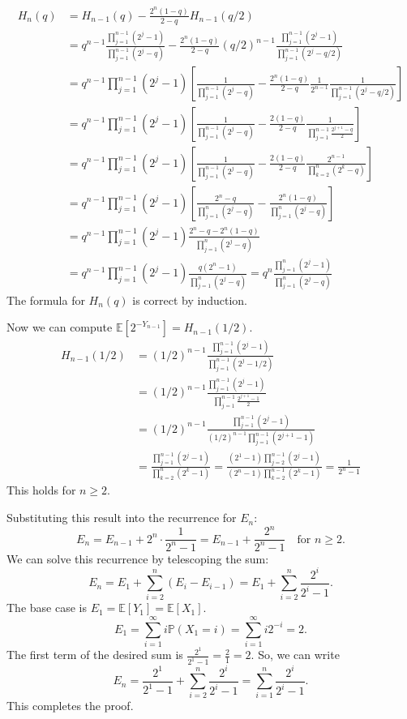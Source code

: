 \documentclass[12pt,a4paper]{article}
\theoremstyle{definition}
\begin{document}
    \begin{align}
        H_n(q) &= H_{n-1}(q) - \frac{2^n(1-q)}{2-q} H_{n-1}(q/2) \\
        &= q^{n-1} \frac{\prod_{j=1}^{n-1}(2^j-1)}{\prod_{j=1}^{n-1}(2^j-q)} - \frac{2^n(1-q)}{2-q} (q/2)^{n-1} \frac{\prod_{j=1}^{n-1}(2^j-1)}{\prod_{j=1}^{n-1}(2^j-q/2)} \\
        &= q^{n-1}\prod_{j=1}^{n-1}(2^j-1) \left[ \frac{1}{\prod_{j=1}^{n-1}(2^j-q)} - \frac{2^n(1-q)}{2-q} \frac{1}{2^{n-1}} \frac{1}{\prod_{j=1}^{n-1}(2^j-q/2)} \right] \\
        &= q^{n-1}\prod_{j=1}^{n-1}(2^j-1) \left[ \frac{1}{\prod_{j=1}^{n-1}(2^j-q)} - \frac{2(1-q)}{2-q} \frac{1}{\prod_{j=1}^{n-1}\frac{2^{j+1}-q}{2}} \right] \\
        &= q^{n-1}\prod_{j=1}^{n-1}(2^j-1) \left[ \frac{1}{\prod_{j=1}^{n-1}(2^j-q)} - \frac{2(1-q)}{2-q} \frac{2^{n-1}}{\prod_{k=2}^{n}(2^k-q)} \right] \\
        &= q^{n-1}\prod_{j=1}^{n-1}(2^j-1) \left[ \frac{2^n-q}{\prod_{j=1}^{n}(2^j-q)} - \frac{2^n(1-q)}{\prod_{j=1}^{n}(2^j-q)} \right] \\
        &= q^{n-1}\prod_{j=1}^{n-1}(2^j-1) \frac{2^n-q - 2^n(1-q)}{\prod_{j=1}^{n}(2^j-q)} \\
        &= q^{n-1}\prod_{j=1}^{n-1}(2^j-1) \frac{q(2^n-1)}{\prod_{j=1}^{n}(2^j-q)} = q^n \frac{\prod_{j=1}^{n}(2^j-1)}{\prod_{j=1}^{n}(2^j-q)}
    \end{align}
    The formula for $H_n(q)$ is correct by induction.

    Now we can compute $\mathbb{E}[2^{-Y_{n-1}}] = H_{n-1}(1/2)$.
    \begin{align}
        H_{n-1}(1/2) &= (1/2)^{n-1} \frac{\prod_{j=1}^{n-1}(2^j-1)}{\prod_{j=1}^{n-1}(2^j-1/2)} \\
        &= (1/2)^{n-1} \frac{\prod_{j=1}^{n-1}(2^j-1)}{\prod_{j=1}^{n-1}\frac{2^{j+1}-1}{2}} \\
        &= (1/2)^{n-1} \frac{\prod_{j=1}^{n-1}(2^j-1)}{(1/2)^{n-1}\prod_{j=1}^{n-1}(2^{j+1}-1)} \\
        &= \frac{\prod_{j=1}^{n-1}(2^j-1)}{\prod_{k=2}^{n}(2^k-1)} = \frac{(2^1-1)\prod_{j=2}^{n-1}(2^j-1)}{(2^n-1)\prod_{k=2}^{n-1}(2^k-1)} = \frac{1}{2^n-1}
    \end{align}
    This holds for $n \geq 2$.

    Substituting this result into the recurrence for $E_n$:
    \[ E_n = E_{n-1} + 2^n \cdot \frac{1}{2^n-1} = E_{n-1} + \frac{2^n}{2^n-1} \quad \text{for } n \geq 2. \]
    We can solve this recurrence by telescoping the sum:
    \[ E_n = E_1 + \sum_{i=2}^n (E_i - E_{i-1}) = E_1 + \sum_{i=2}^n \frac{2^i}{2^i-1}. \]
    The base case is $E_1 = \mathbb{E}[Y_1] = \mathbb{E}[X_1]$.
    \[ E_1 = \sum_{i=1}^{\infty} i \mathbb{P}(X_1=i) = \sum_{i=1}^{\infty} i 2^{-i} = 2. \]
    The first term of the desired sum is $\frac{2^1}{2^1-1} = \frac{2}{1} = 2$.
    So, we can write
    \[ E_n = \frac{2^1}{2^1-1} + \sum_{i=2}^n \frac{2^i}{2^i-1} = \sum_{i=1}^n \frac{2^i}{2^i-1}. \]
    This completes the proof.
\end{document}
